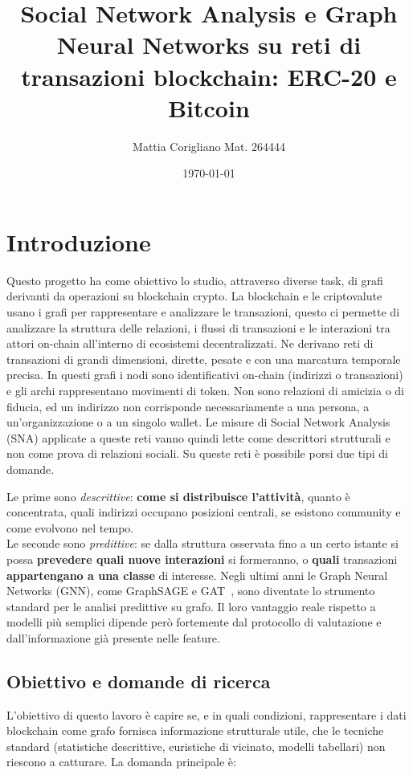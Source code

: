 \documentclass[11pt]{article}
\title{Social Network Analysis e Graph Neural Networks su reti di transazioni blockchain: ERC-20 e Bitcoin}
\author{Mattia Corigliano Mat. 264444}
\date{\today}
\begin{document}
\maketitle

\tableofcontents
\newpage
\section{Introduzione}\label{sec:introduzione}
Questo progetto ha come obiettivo lo studio, attraverso diverse task, di grafi derivanti da operazioni su blockchain crypto.
La blockchain e le criptovalute usano i grafi per rappresentare e analizzare le transazioni, questo ci permette di analizzare la struttura delle relazioni, i flussi di transazioni e le interazioni tra attori on-chain all'interno di ecosistemi decentralizzati.
Ne derivano reti di transazioni di grandi dimensioni,
dirette, pesate e con una marcatura temporale precisa. In questi grafi i nodi sono identificativi on-chain
(indirizzi o transazioni) e gli archi rappresentano movimenti di token. Non
sono relazioni di amicizia o di fiducia, ed un indirizzo non corrisponde
necessariamente a una persona, a un'organizzazione o a un singolo wallet. Le
misure di Social Network Analysis (SNA) applicate a queste reti vanno quindi
lette come descrittori strutturali e non come prova di relazioni sociali. Su queste reti è possibile porsi due tipi di domande.

Le prime sono \emph{descrittive}: \textbf{come si distribuisce l'attività}, quanto è concentrata,
quali indirizzi occupano posizioni centrali, se esistono community e come
evolvono nel tempo.\\ Le seconde sono \emph{predittive}: se dalla struttura
osservata fino a un certo istante si possa \textbf{prevedere quali nuove interazioni}
si formeranno, o \textbf{quali} transazioni \textbf{appartengano a una classe} di interesse.
Negli ultimi anni le Graph Neural Networks (GNN), come GraphSAGE
\cite{hamilton2017graphsage} e GAT~\cite{velickovic2018gat}, sono diventate lo
strumento standard per le analisi predittive su grafo. Il loro vantaggio
reale rispetto a modelli più semplici dipende però fortemente dal protocollo
di valutazione e dall'informazione già presente nelle feature.

\subsection{Obiettivo e domande di ricerca}

L'obiettivo di questo lavoro è capire se, e in quali condizioni, rappresentare
i dati blockchain come grafo fornisca informazione strutturale utile, che le
tecniche standard (statistiche descrittive, euristiche di vicinato, modelli
tabellari) non riescono a catturare. La domanda principale è:
\end{document}
